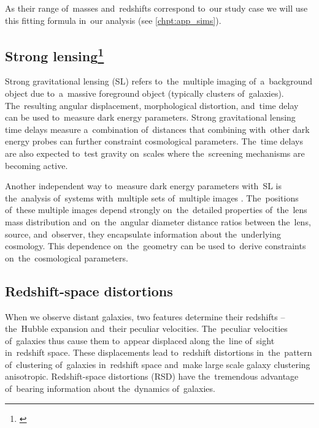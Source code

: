 As their range of~masses and~redshifts correspond to~our study case we will use this fitting formula in~our analysis (see \autoref{chpt:app_sims}).
\DIFdelbegin %
\DIFdelend \DIFaddbegin \subsection[Strong lensing]{\DIFaddend Strong lensing\DIFaddbegin \footnote{\label{ftn2}}\DIFaddend }
\DIFaddbegin \label{ssec:SL}
\DIFaddend Strong gravitational lensing (SL) refers to~the~multiple imaging of~a~background object due to~a~massive foreground object (typically clusters of~galaxies). The~resulting angular displacement, morphological distortion, and~time delay can be used to~measure dark energy parameters. Strong gravitational lensing time delays measure a~combination of~distances that combining with~other dark energy probes can further constraint cosmological parameters. The~time delays are also expected to~test gravity on~scales where the~screening mechanisms are becoming active.

Another independent way to~measure dark energy parameters with~SL is the~analysis of~systems with~multiple sets of~multiple images \textcite{SL_in_CLGs}. The~positions of~these multiple images depend strongly on~the~detailed properties of~the~lens mass distribution and~on~the~angular diameter distance ratios between the~lens, source, and~observer, they encapsulate information about the~underlying cosmology. This dependence on~the~geometry can be used to~derive constraints on~the~cosmological parameters.
\DIFdelbegin %
\DIFdelend \DIFaddbegin \subsection[Redshift-space distortions]{\DIFaddend Redshift-space distortions\DIFaddbegin {}\DIFaddend }
\label{sec:rsd}
When we observe distant galaxies, two features determine their redshifts -- the~Hubble expansion and~their peculiar velocities. The~peculiar velocities of~galaxies thus cause them to~appear displaced along the~line of~sight in~redshift space. These displacements lead to~redshift distortions in~the~pattern of~clustering of~galaxies in~redshift space and~make large scale galaxy clustering anisotropic. Redshift-space distortions (RSD) have the~tremendous advantage of~bearing information about the~dynamics of~galaxies.

